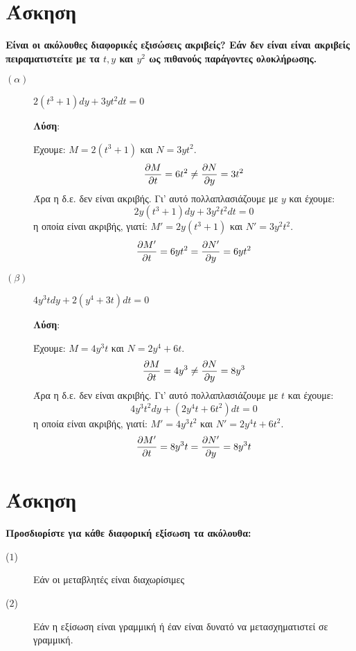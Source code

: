 \documentclass[a4paper,12pt]{article}
\begin{document}
\vspace{2\baselineskip}

\section{Άσκηση} {\bfseries Είναι οι ακόλουθες διαφορικές εξισώσεις ακριβείς? Εάν δεν είναι είναι ακριβείς πειραματιστείτε με τα $t,y$ και $y^2$ ως πιθανούς παράγοντες ολοκλήρωσης.}

\vspace{2\baselineskip}

\begin{description}

\item [$(\alpha)$] $\boxed{2(t^3+1)dy + 3yt^2dt = 0}$

\textbf{Λύση}:

\vspace{\baselineskip}

Έχουμε:
$M=2(t^3+1)$ και $N=3yt^2$.
\[
\pdv{M}{t} = 6t^2 \neq
\pdv{N}{y}= 3t^2
\]
Άρα η δ.ε. δεν είναι ακριβής. Γι' αυτό πολλαπλασιάζουμε με $y$ και έχουμε:
\[
2y(t^3+1)dy + 3y^2t^2dt = 0
\]
η οποία είναι ακριβής, γιατί:
$M'=2y(t^3+1)$ και $N'=3y^2t^2$.
\[
\pdv{M'}{t}= 6yt^2 = \pdv{N'}{y}=6yt^2
\]

\vspace{\baselineskip}

\item [$(\beta)$] $\boxed{4y^3tdy + 2(y^4+3t)dt = 0}$

\textbf{Λύση}:

\vspace{\baselineskip}

Έχουμε:
$M=4y^3t$ και $N=2y^4+6t$.
\[
\pdv{M}{t} = 4y^3 \neq
\pdv{N}{y}=8y^3
\]
Άρα η δ.ε. δεν είναι ακριβής. Γι' αυτό πολλαπλασιάζουμε με $t$ και έχουμε:
\[
4y^3t^2dy + (2y^4t+6t^2)dt = 0
\]
η οποία είναι ακριβής, γιατί:
$M'=4y^3t^2$ και $N'=2y^4t+6t^2$.
\[
\pdv{M'}{t}= 8y^3t = \pdv{N'}{y}=8y^3t
\]
\end{description}

\vspace{2\baselineskip}

\section{Άσκηση}{\bfseries  Προσδιορίστε για κάθε διαφορική εξίσωση τα ακόλουθα:
\begin{description}
\item [($1$)]Εάν οι μεταβλητές είναι διαχωρίσιμες
\item [($2$)]Εάν η εξίσωση είναι γραμμική ή έαν είναι δυνατό να μετασχηματιστεί σε γραμμική.
\end{description}}
\end{document}

